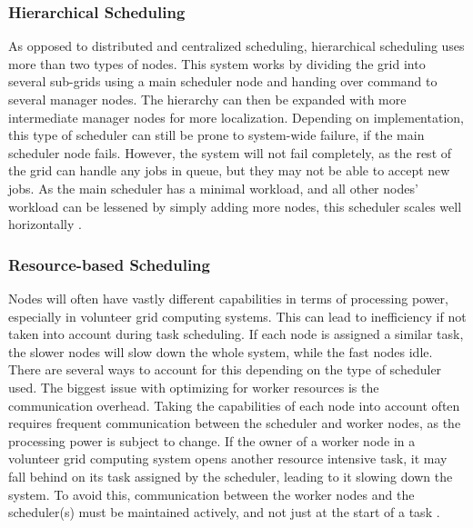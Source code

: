 \subsubsection{Hierarchical Scheduling}
As opposed to distributed and centralized scheduling, hierarchical scheduling uses more than two types of nodes. This system works by dividing the grid into several sub-grids using a main scheduler node and handing over command to several manager nodes. The hierarchy can then be expanded with more intermediate manager nodes for more localization. Depending on implementation, this type of scheduler can still be prone to system-wide failure, if the main scheduler node fails. However, the system will not fail completely, as the rest of the grid can handle any jobs in queue, but they may not be able to accept new jobs. As the main scheduler has a minimal workload, and all other nodes' workload can be lessened by simply adding more nodes, this scheduler scales well horizontally \cite{Behnam1330, TaskSchedulingReview}.

\subsubsection{Resource-based Scheduling}
Nodes will often have vastly different capabilities in terms of processing power, especially in volunteer grid computing systems. This can lead to inefficiency if not taken into account during task scheduling. If each node is assigned a similar task, the slower nodes will slow down the whole system, while the fast nodes idle. There are several ways to account for this depending on the type of scheduler used. The biggest issue with optimizing for worker resources is the communication overhead. Taking the capabilities of each node into account often requires frequent communication between the scheduler and worker nodes, as the processing power is subject to change. If the owner of a worker node in a volunteer grid computing system opens another resource intensive task, it may fall behind on its task assigned by the scheduler, leading to it slowing down the system. To avoid this, communication between the worker nodes and the scheduler(s) must be maintained actively, and not just at the start of a task \cite{abhang_2012}.